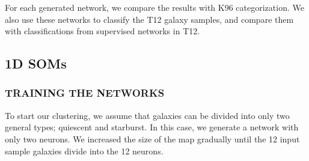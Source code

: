     For each generated network, we compare the results with K96 categorization.
    We also use these networks to classify the T12 galaxy samples, and compare them with classifications from supervised networks in T12.
    \subsection{1D SOMs}
    \label{sec: 1D}
        \subsubsection{TRAINING THE NETWORKS}
        \label{sec: 1Dt}
            To start our clustering, we assume that galaxies can be divided into only two general types; quiescent and starburst.
            In this case, we generate a network with only two neurons.
            We increased the size of the map gradually until the 12 input sample galaxies divide into the 12 neurons. 
        
